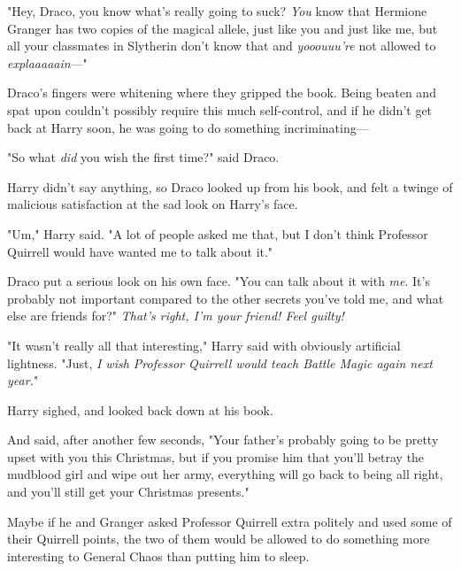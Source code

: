 "Hey, Draco, you know what's really going to suck? \emph{You} know that
Hermione Granger has two copies of the magical allele, just like you and just
like me, but all your classmates in Slytherin don't know that and
\emph{yooouuu're} not allowed to \emph{explaaaaain}---"

Draco's fingers were whitening where they gripped the book. Being beaten and
spat upon couldn't possibly require this much self-control, and if he didn't
get back at Harry soon, he was going to do something incriminating---

"So what \emph{did} you wish the first time?" said Draco.

Harry didn't say anything, so Draco looked up from his book, and felt a twinge
of malicious satisfaction at the sad look on Harry's face.

"Um," Harry said. "A lot of people asked me that, but I don't think Professor
Quirrell would have wanted me to talk about it."

Draco put a serious look on his own face. "You can talk about it with
\emph{me}. It's probably not important compared to the other secrets you've
told me, and what else are friends for?" \emph{That's right, I'm your friend!
Feel guilty!}

"It wasn't really all that interesting," Harry said with obviously artificial
lightness. "Just, \emph{I wish Professor Quirrell would teach Battle Magic
again next year.}"

Harry sighed, and looked back down at his book.

And said, after another few seconds, "Your father's probably going to be pretty
upset with you this Christmas, but if you promise him that you'll betray the
mudblood girl and wipe out her army, everything will go back to being all
right, and you'll still get your Christmas presents."

Maybe if he and Granger asked Professor Quirrell extra politely and used some
of their Quirrell points, the two of them would be allowed to do something more
interesting to General Chaos than putting him to sleep.
